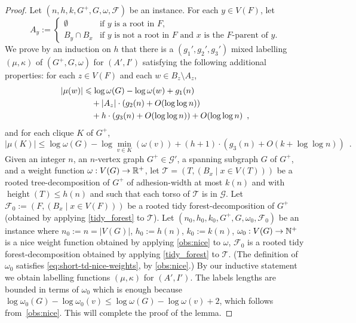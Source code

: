 \documentclass{patmorin}
\let\eqref\cref
\renewcommand{\le}{\leqslant}
\renewcommand{\leq}{\leqslant}
\DeclareMathOperator{\height}{height}
\newcommand{\Oh}{O}
\begin{document}
\begin{proof}
  Let $(n,h,k,G^+,G,\omega,\mathcal{F})$ be an instance.
  For each $y\in V(F)$, let
  \[
    A_y:=\begin{cases}
      \emptyset   & \textrm{if $y$ is a root in $F$,}                                      \\
      B_y\cap B_x & \textrm{if $y$ is not a root in $F$ and $x$ is the $F$-parent of $y$.}
    \end{cases}
  \]
  We prove by an induction on $h$ that there is a $(g_1',g_2',g_3')$ mixed labelling $(\mu,\kappa)$ of $(G^+,G,\omega)$ for $(A',I')$ satisfying the following additional properties: for each $z\in V(F)$ and each $w\in B_z\setminus A_z$,
  \begin{align}
    |\mu(w)|
     & \le \log \omega(G) - \log \omega(w) + g_1(n)\notag                           \\
     & \quad {} + |A_z|\cdot (g_2(n) + \Oh(\log\log n))\label{strong_strong}        \\
     & \quad {} + h\cdot(g_3(n) + \Oh(\log\log n)) + \Oh(\log\log n)\enspace,\notag
  \end{align}
  and for each clique $K$ of $G^+$,
  \begin{equation}
    |\mu(K)| \le \log\omega(G) - \log\min_{v\in K}(\omega(v)) + (h+1)\cdot(g_3(n) + \Oh(k+\log\log n))\enspace.\label{strong_clique}
  \end{equation}
  Given an integer $n$, an $n$-vertex graph $G^+\in\mathcal{G}'$, a spanning subgraph $G$ of $G^+$, and a weight function $\omega:V(G)\to\mathbb{R}^+$, let $\mathcal{T}=(T,(B_x \mid x\in V(T)))$ be a rooted tree-decomposition of $G^+$ of adhesion-width at most $k(n)$ and with $\height(T)\leq h(n)$ and such that each torso of $\mathcal{T}$ is in $\mathcal{G}$. Let $\mathcal{F}_0:=(F,(B_x \mid x\in V(F)))$ be a rooted tidy forest-decomposition of $G^+$ (obtained by applying \cref{tidy_forest} to $\mathcal{T}$).  Let $(n_0,h_0,k_0,G^+,G,\omega_0,\mathcal{F}_0)$ be an instance where $n_0:=n=|V(G)|$, $h_0:=h(n)$, $k_0:=k(n)$, $\omega_0:V(G)\to\mathbb{N}^+$ is a nice weight function obtained by applying \cref{obs:nice} to $\omega$, $\mathcal{F}_0$ is a rooted tidy forest-decomposition obtained by applying \cref{tidy_forest} to $\mathcal{T}$.  (The definition of $\omega_0$ satisfies \eqref{eq:short-td-nice-weights}, by \cref{obs:nice}.)
  By our inductive statement we obtain labelling functions $(\mu,\kappa)$ for $(A',I')$.
  The labels lengths are bounded in terms of $\omega_0$ which is enough because $\log\omega_0(G) - \log\omega_0(v) \leq \log\omega(G)-\log\omega(v)+2$, which follows from~\cref{obs:nice}.
  This will complete the proof of the lemma.


\end{proof}
\end{document}
